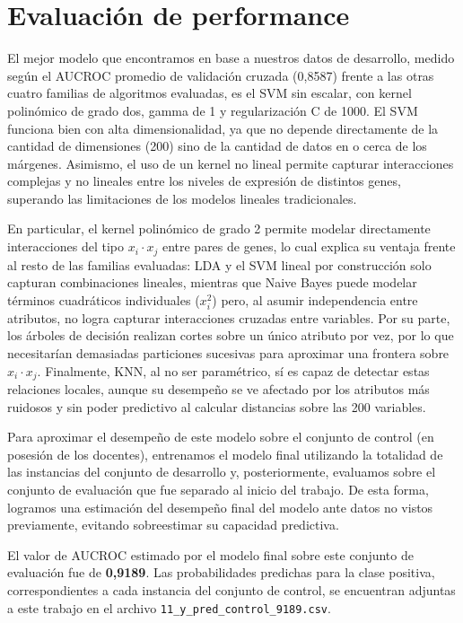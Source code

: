 \documentclass[10pt,a4paper]{article}
\begin{document}
\section{Evaluación de performance}
El mejor modelo que encontramos en base a nuestros datos de desarrollo, medido según el AUCROC promedio de validación cruzada (0,8587) frente a las otras cuatro familias de algoritmos evaluadas, es el SVM sin escalar, con kernel polinómico de grado dos, gamma de 1 y regularización C de 1000. El SVM funciona bien con alta dimensionalidad, ya que no depende directamente de la cantidad de dimensiones (200) sino de la cantidad de datos en o cerca de los márgenes. Asimismo, el uso de un kernel no lineal permite capturar interacciones complejas y no lineales entre los niveles de expresión de distintos genes, superando las limitaciones de los modelos lineales tradicionales.

En particular, el kernel polinómico de grado 2 permite modelar directamente interacciones del tipo $x_i \cdot x_j$ entre pares de genes, lo cual explica su ventaja frente al resto de las familias evaluadas: LDA y el SVM lineal por construcción solo capturan combinaciones lineales, mientras que Naive Bayes puede modelar términos cuadráticos individuales ($x_i^2$) pero, al asumir independencia entre atributos, no logra capturar interacciones cruzadas entre variables. Por su parte, los árboles de decisión realizan cortes sobre un único atributo por vez, por lo que necesitarían demasiadas particiones sucesivas para aproximar una frontera sobre $x_i \cdot x_j$. Finalmente, KNN, al no ser paramétrico, sí es capaz de detectar estas relaciones locales, aunque su desempeño se ve afectado por los atributos más ruidosos y sin poder predictivo al calcular distancias sobre las 200 variables.

Para aproximar el desempeño de este modelo sobre el conjunto de control (en posesión de los docentes), entrenamos el modelo final utilizando la totalidad de las instancias del conjunto de desarrollo y, posteriormente, evaluamos sobre el conjunto de evaluación que fue separado al inicio del trabajo. De esta forma, logramos una estimación del desempeño final del modelo ante datos no vistos previamente, evitando sobreestimar su capacidad predictiva.

El valor de AUCROC estimado por el modelo final sobre este conjunto de evaluación fue de \textbf{0,9189}. Las probabilidades predichas para la clase positiva, correspondientes a cada instancia del conjunto de control, se encuentran adjuntas a este trabajo en el archivo \texttt{11\_y\_pred\_control\_9189.csv}.
\end{document}
